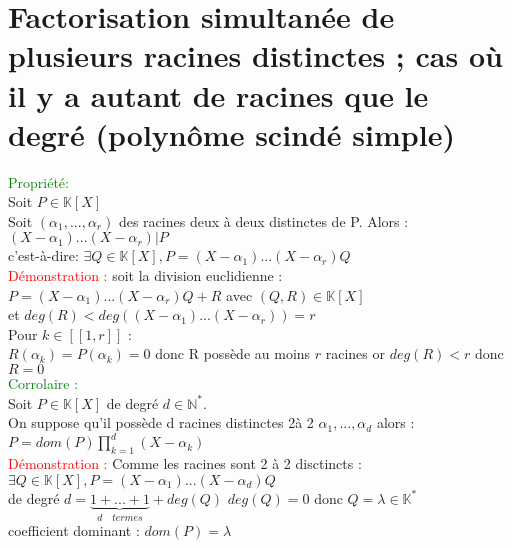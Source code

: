\documentclass{article}
\begin{document}
\section{Factorisation simultanée de plusieurs racines distinctes ; cas où il y a autant de racines que le degré (polynôme scindé simple)}
\textcolor{green}{Propriété:} \\
Soit $P \in \mathbb K [X]$ \\
Soit $(\alpha_1,...,\alpha_r)$ des racines deux à deux distinctes de P. Alors : \\
$(X-\alpha_1)...(X-\alpha_r)|P$ \\
c'est-à-dire: $\exists Q \in \mathbb K  [X], P=(X-\alpha_1)...(X-\alpha_r)Q$\\
\textcolor{red}{Démonstration :} soit la division euclidienne : \\
$P=(X-\alpha_1)...(X -\alpha_r)Q +R$  avec $(Q,R) \in \mathbb K [X]$ \\
et $deg(R)<deg((X-\alpha_1) ...(X- \alpha_r))=r$ \\
Pour $k \in [[1,r]]$ : \\
$R(\alpha_k)=P(\alpha_k)=0$ donc R possède au moins $r$ racines or $deg(R)<r$ donc $R=0$\\
\textcolor{green}{Corrolaire :} \\
Soit $P \in \mathbb K [X]$ de degré $d \in \mathbb N^*$. \\
On suppose qu'il possède d racines distinctes 2à 2 $\alpha_1,...,\alpha_d$ alors : \\
$P=dom(P) \prod_{k=1}^d (X-\alpha_k)$ \\
\textcolor{red}{Démonstration : } Comme les racines sont 2 à 2 disctincts : \\
$\exists Q \in \mathbb K [X], P=(X- \alpha_1)...(X- \alpha_d)Q$ \\
de degré $d=\underbrace{1+ ...+1}_{d \quad termes} + deg(Q)$ $deg(Q)=0$ donc $Q=\lambda \in \mathbb K^*$ \\
coefficient dominant : $dom(P)=\lambda$
\end{document}
